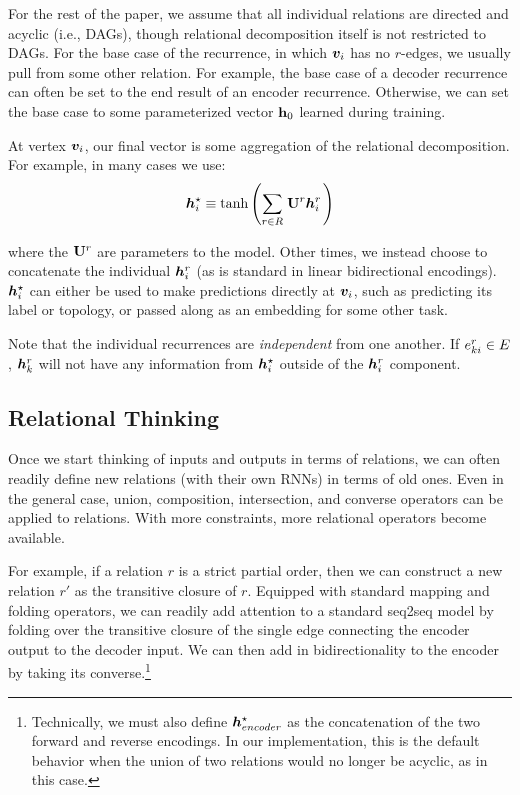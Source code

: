 For the rest of the paper, we assume that all individual relations are directed 
and acyclic (i.e., DAGs), though relational decomposition itself is not 
restricted to DAGs.  For the base case of the recurrence, in which ${\bm{v}}_i$ has 
no $r$-edges, we usually pull from some other relation. For example, the base 
case of a decoder recurrence can often be set to the end result of an encoder 
recurrence.  Otherwise, we can set the base case to some parameterized vector 
${\mathbf{h}}_0$ learned during training.

At vertex ${\bm{v}}_i$, our final vector is some aggregation of the relational 
decomposition. For example, in many cases we use:
\begin{equation}
	{\bm{h}}^\star_i \equiv \tanh\left(\sum_{r \in R}\left.{\mathbf{U}}^r {\bm{h}}^r_i\right.\right)
\end{equation}

where the ${\mathbf{U}}^r$ are parameters to the model. Other times, we instead choose 
to concatenate the individual ${\bm{h}}_i^r$ (as is standard in linear bidirectional 
encodings). ${\bm{h}}^\star_i$ can either be used to make predictions directly at 
${\bm{v}}_i$, such as predicting its label or topology, or passed along as an 
embedding for some other task.

Note that the individual recurrences are \textit{independent} from one another.  
If $e_{ki}^r\in E$, ${\bm{h}}_k^r$ will not have any information from 
${\bm{h}}^\star_i$ outside of the ${\bm{h}}^r_i$ component.

\subsection{Relational Thinking}

Once we start thinking of inputs and outputs in terms of relations, we can often 
readily define new relations (with their own RNNs) in terms of old ones.  Even 
in the general case, union, composition, intersection, and converse operators 
can be applied to relations. With more constraints, more relational operators 
become available.

For example, if a relation $r$ is a strict partial order, then we can construct 
a new relation $r'$ as the transitive closure of $r$. Equipped with standard 
mapping and folding operators, we can readily add attention to a standard 
seq2seq model by folding over the transitive closure of the single edge
connecting the encoder output to the decoder input. We can then add in 
bidirectionality to the encoder by taking its converse.\footnote{Technically, we 
	must also define ${\bm{h}}_{encoder}^\star$ as the concatenation of the two forward 
and reverse encodings. In our implementation, this is the default behavior when 
the union of two relations would no longer be acyclic, as in this case.}

